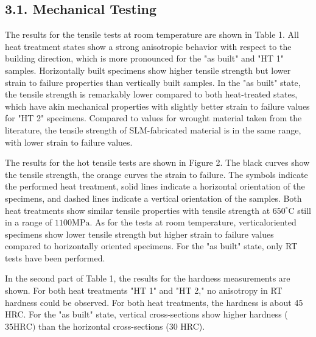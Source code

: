 \documentclass[10pt]{article}
\begin{document}
\subsection*{3.1. Mechanical Testing}
The results for the tensile tests at room temperature are shown in Table 1. All heat treatment states show a strong anisotropic behavior with respect to the building direction, which is more pronounced for the "as built" and "HT 1" samples. Horizontally built specimens show higher tensile strength but lower strain to failure properties than vertically built samples. In the "as built" state, the tensile strength is remarkably lower compared to both heat-treated states, which have akin mechanical properties with slightly better strain to failure values for "HT 2" specimens. Compared to values for wrought material taken from the literature, the tensile strength of SLM-fabricated material is in the same range, with lower strain to failure values.

The results for the hot tensile tests are shown in Figure 2. The black curves show the tensile strength, the orange curves the strain to failure. The symbols indicate the performed heat treatment, solid lines indicate a horizontal orientation of the specimens, and dashed lines indicate a vertical orientation of the samples. Both heat treatments show similar tensile properties with tensile strength at $650^{\circ} \mathrm{C}$ still in a range of $1100 \mathrm{MPa}$. As for the tests at room temperature, verticaloriented specimens show lower tensile strength but higher strain to failure values compared to horizontally oriented specimens. For the "as built" state, only RT tests have been performed.

In the second part of Table 1, the results for the hardness measurements are shown. For both heat treatments "HT 1" and "HT 2," no anisotropy in RT hardness could be observed. For both heat treatments, the hardness is about 45 HRC. For the "as built" state, vertical cross-sections show higher hardness ( $35 \mathrm{HRC})$ than the horizontal cross-sections (30 HRC).
\end{document}
